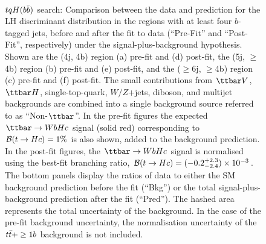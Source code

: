 \begin{figure}[htbp]
\begin{center}
 \\
\caption{\small{$tqH(b\bar{b})$ search: Comparison between the data and prediction for the LH discriminant distribution in the regions with at least four $b$-tagged jets,
before and after the fit to data  (``Pre-Fit'' and ``Post-Fit'', respectively) under the signal-plus-background hypothesis.
Shown are the (4j, 4b) region (a) pre-fit and (d) post-fit,  the (5j, $\geq$4b) region (b) pre-fit and (e) post-fit, and
the ($\geq$6j, $\geq$4b) region (c) pre-fit and (f) post-fit.
The small contributions from $\ttbar V$, $\ttbar H$, single-top-quark, $W/Z$+jets, diboson, and multijet backgrounds are combined into a single background source 
referred to as ``Non-$\ttbar$''. 
In the pre-fit figures the expected $\Hc$ signal (solid red) corresponding to $\mathcal{B}(t\to Hc)=1\%$ is also shown,
added to the background prediction. In the post-fit figures, the $\Hc$ signal is normalised using the best-fit branching ratio, 
$\mathcal{B}(t\to Hc)=(-0.2^{+2.3}_{-2.4}) \times 10^{-3}$.
The bottom panels display the ratios of data to either the SM background prediction before the fit (``Bkg'')  or the total signal-plus-background
prediction after the fit (``Pred''). 
The hashed area represents the total uncertainty of the background.
In the case of the pre-fit background uncertainty, the normalisation uncertainty of the $t\bar{t}+\geq1b$ background is not included. }}
\label{fig:prepostfit_unblinded_WbHc_4btagin}
\end{center}
\end{figure}

